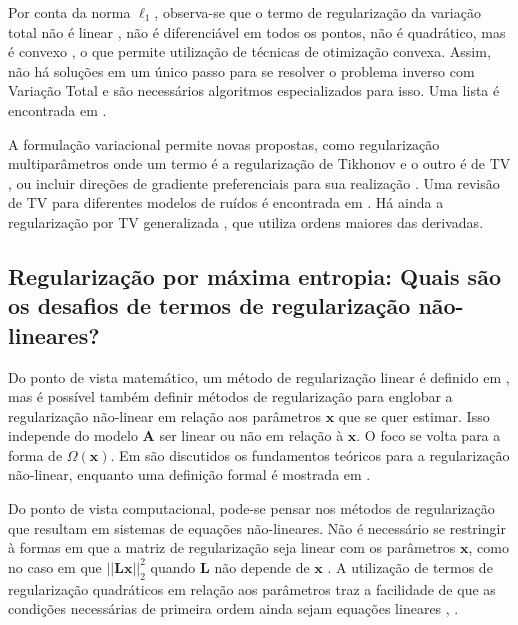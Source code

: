 Por conta da norma $\ell_1$, observa-se que o termo de regularização da variação total não é linear \cite{Rudin1992}, não é diferenciável em todos os pontos, não é quadrático, mas é convexo \cite[pág. 268]{2010Chambolle}, o que permite utilização de técnicas de otimização convexa. Assim, não há soluções em um único passo para se resolver o problema inverso com Variação Total e são necessários algoritmos especializados para isso. Uma lista é encontrada em \cite{Dahl2009}. 

A formulação variacional permite novas propostas, como regularização multiparâmetros onde um termo é a regularização de Tikhonov e o outro é de TV \cite{Gholami2013}, ou incluir direções de gradiente preferenciais para sua realização \cite{Kongskov2019}. Uma revisão de TV para diferentes modelos de ruídos é encontrada em \cite{Rodriguez2013}. Há ainda a regularização por TV generalizada  \cite{Bredies2010}, que utiliza ordens maiores das derivadas. 





\subsection{Regularização por máxima entropia: Quais são os desafios de termos de regularização não-lineares?}
Do ponto de vista matemático, um método de regularização linear é definido em \cite[Definição 4.2]{Benning2018}, mas é possível também definir métodos de regularização para englobar a regularização não-linear em relação aos parâmetros $\mathbf{x}$ que se quer estimar. Isso independe do modelo $\mathbf{A}$ ser linear ou não em relação à $\mathbf{x}$. O foco se volta para a forma de $\Omega(\mathbf{x})$. Em \cite[Seção 4]{Benning2018} são discutidos os fundamentos teóricos para a regularização não-linear, enquanto uma definição formal é mostrada em \cite[Definição 4.7]{Benning2018}. 

Do ponto de vista computacional, pode-se pensar nos métodos de regularização que resultam em sistemas de equações não-lineares. Não é necessário se restringir à formas em que a matriz de regularização seja linear com os parâmetros $\mathbf{x}$, como no caso em que  $\vert \vert \mathbf{L} \mathbf{x} \vert \vert_2^2$ quando $\mathbf{L}$ não depende de $\mathbf{x}$ . A utilização de termos de regularização quadráticos em relação aos parâmetros traz a facilidade de que as condições necessárias de primeira ordem ainda sejam equações lineares \cite[Seção 5.3]{engl1996regularization}, \cite[pág. 180]{luenberger2015linear}. 

